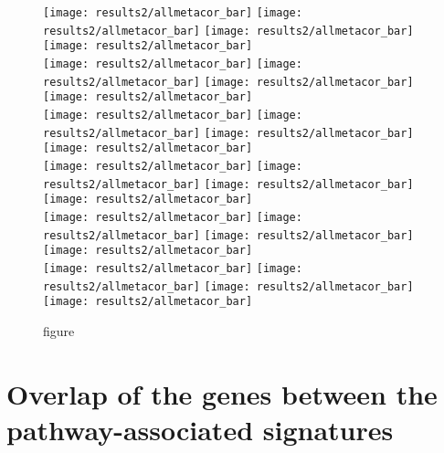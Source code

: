 	\begin{figure}[htpb]
		\ContinuedFloat
		\captionsetup{list=off,format=cont}
		\centering
		\texttt{[image: results2/allmetacor\_bar]}
		\texttt{[image: results2/allmetacor\_bar]}
		\texttt{[image: results2/allmetacor\_bar]}
		\texttt{[image: results2/allmetacor\_bar]}\\
		\texttt{[image: results2/allmetacor\_bar]}
		\texttt{[image: results2/allmetacor\_bar]}
		\texttt{[image: results2/allmetacor\_bar]}
		\texttt{[image: results2/allmetacor\_bar]}\\
		\texttt{[image: results2/allmetacor\_bar]}
		\texttt{[image: results2/allmetacor\_bar]}
		\texttt{[image: results2/allmetacor\_bar]}
		\texttt{[image: results2/allmetacor\_bar]}\\
		\texttt{[image: results2/allmetacor\_bar]}
		\texttt{[image: results2/allmetacor\_bar]}
		\texttt{[image: results2/allmetacor\_bar]}
		\texttt{[image: results2/allmetacor\_bar]}\\
		\texttt{[image: results2/allmetacor\_bar]}
		\texttt{[image: results2/allmetacor\_bar]}
		\texttt{[image: results2/allmetacor\_bar]}
		\texttt{[image: results2/allmetacor\_bar]}\\
		\texttt{[image: results2/allmetacor\_bar]}
		\texttt{[image: results2/allmetacor\_bar]}
		\texttt{[image: results2/allmetacor\_bar]}
		\texttt{[image: results2/allmetacor\_bar]}\\
		\caption{figure}
	\end{figure}
	\newpage

	\section{Overlap of the genes between the pathway-associated signatures}
	\label{sec:overlap_of_the_genes_between_the_pathway_associated_signatures}
	
